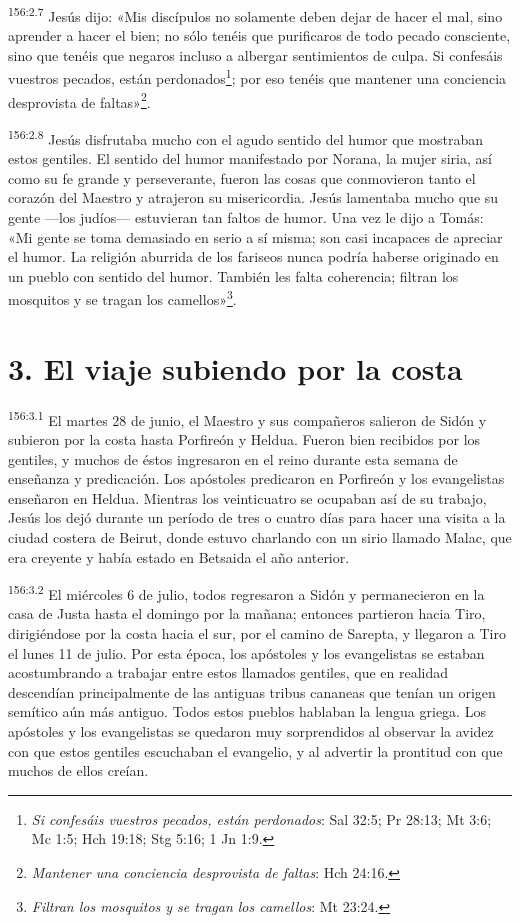\par
\textsuperscript{156:2.7} Jesús dijo: «Mis discípulos no solamente deben dejar de hacer el mal, sino aprender a hacer el bien; no sólo tenéis que purificaros de todo pecado consciente, sino que tenéis que negaros incluso a albergar sentimientos de culpa. Si confesáis vuestros pecados, están perdonados\footnote{\textit{Si confesáis vuestros pecados, están perdonados}: Sal 32:5; Pr 28:13; Mt 3:6; Mc 1:5; Hch 19:18; Stg 5:16; 1 Jn 1:9.}; por eso tenéis que mantener una conciencia desprovista de faltas»\footnote{\textit{Mantener una conciencia desprovista de faltas}: Hch 24:16.}.

\par
\textsuperscript{156:2.8} Jesús disfrutaba mucho con el agudo sentido del humor que mostraban estos gentiles. El sentido del humor manifestado por Norana, la mujer siria, así como su fe grande y perseverante, fueron las cosas que conmovieron tanto el corazón del Maestro y atrajeron su misericordia. Jesús lamentaba mucho que su gente ---los judíos--- estuvieran tan faltos de humor. Una vez le dijo a Tomás: «Mi gente se toma demasiado en serio a sí misma; son casi incapaces de apreciar el humor. La religión aburrida de los fariseos nunca podría haberse originado en un pueblo con sentido del humor. También les falta coherencia; filtran los mosquitos y se tragan los camellos»\footnote{\textit{Filtran los mosquitos y se tragan los camellos}: Mt 23:24.}.

\section*{3. El viaje subiendo por la costa}
\par
\textsuperscript{156:3.1} El martes 28 de junio, el Maestro y sus compañeros salieron de Sidón y subieron por la costa hasta Porfireón y Heldua. Fueron bien recibidos por los gentiles, y muchos de éstos ingresaron en el reino durante esta semana de enseñanza y predicación. Los apóstoles predicaron en Porfireón y los evangelistas enseñaron en Heldua. Mientras los veinticuatro se ocupaban así de su trabajo, Jesús los dejó durante un período de tres o cuatro días para hacer una visita a la ciudad costera de Beirut, donde estuvo charlando con un sirio llamado Malac, que era creyente y había estado en Betsaida el año anterior.

\par
\textsuperscript{156:3.2} El miércoles 6 de julio, todos regresaron a Sidón y permanecieron en la casa de Justa hasta el domingo por la mañana; entonces partieron hacia Tiro, dirigiéndose por la costa hacia el sur, por el camino de Sarepta, y llegaron a Tiro el lunes 11 de julio. Por esta época, los apóstoles y los evangelistas se estaban acostumbrando a trabajar entre estos llamados gentiles, que en realidad descendían principalmente de las antiguas tribus cananeas que tenían un origen semítico aún más antiguo. Todos estos pueblos hablaban la lengua griega. Los apóstoles y los evangelistas se quedaron muy sorprendidos al observar la avidez con que estos gentiles escuchaban el evangelio, y al advertir la prontitud con que muchos de ellos creían.

